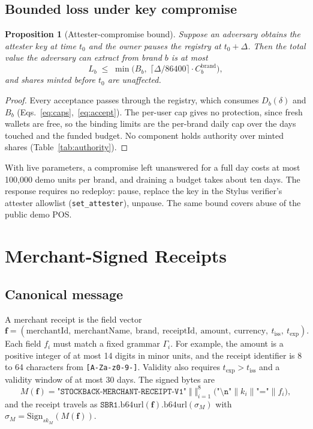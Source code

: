 \documentclass[10.5pt,letterpaper]{article}
\newtheorem{proposition}{Proposition}
\theoremstyle{definition}
\theoremstyle{remark}
\newcommand{\ttt}[1]{\texttt{#1}}
\newcommand{\cat}{\mathbin{\|}}
\begin{document}
\subsection{Bounded loss under key compromise}
\begin{proposition}[Attester-compromise bound]\label{prop:bound}
Suppose an adversary obtains the attester key at time $t_0$ and the owner pauses the registry at $t_0+\Delta$. Then the
total value the adversary can extract from brand $b$ is at most
\begin{equation}\label{eq:bound}
L_b \;\le\; \min\!\Big( B_b,\; \big\lceil \Delta/86400 \big\rceil \cdot C_b^{\mathrm{brand}} \Big),
\end{equation}
and shares minted before $t_0$ are unaffected.
\end{proposition}
\begin{proof}
Every acceptance passes through the registry, which consumes $D_b(\delta)$ and $B_b$ (Eqs.~\ref{eq:caps},~\ref{eq:accept}).
The per-user cap gives no protection, since fresh wallets are free, so the binding limits are the per-brand daily cap
over the days touched and the funded budget. No component holds authority over minted shares (Table~\ref{tab:authority}).
\end{proof}
With live parameters, a compromise left unanswered for a full day costs at most 100{,}000 demo units per brand, and
draining a budget takes about ten days. The response requires no redeploy: pause, replace the key in the Stylus verifier's
attester allowlist (\ttt{set\_attester}), unpause. The same bound covers abuse of the public demo POS.

\section{Merchant-Signed Receipts}\label{sec:merchant}

\subsection{Canonical message}
A merchant receipt is the field vector
\[ \mathbf{f} = (\text{merchantId},\ \text{merchantName},\ \text{brand},\ \text{receiptId},\ \text{amount},\ \text{currency},\ t_{\mathrm{iss}},\ t_{\mathrm{exp}}). \]
Each field $f_i$ must match a fixed grammar $\Gamma_i$. For example, the amount is a positive integer of at most
14 digits in minor units, and the receipt identifier is 8 to 64 characters from \ttt{[A-Za-z0-9-]}. Validity also
requires $t_{\mathrm{exp}}>t_{\mathrm{iss}}$ and a validity window of at most 30 days.
The signed bytes are
\begin{equation}\label{eq:canon}
M(\mathbf f) = \texttt{"STOCKBACK-MERCHANT-RECEIPT-V1"} \;\Vert\; \big\Vert_{i=1}^{8}\; \big(\texttt{"\textbackslash n"} \cat k_i \cat \texttt{"="} \cat f_i\big),
\end{equation}
and the receipt travels as $\texttt{SBR1}.\mathrm{b64url}(\mathbf f).\mathrm{b64url}(\sigma_M)$ with $\sigma_M=\mathrm{Sign}_{sk_M}(M(\mathbf f))$.
\end{document}
